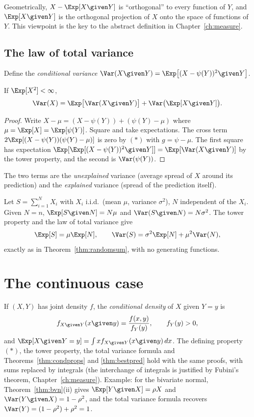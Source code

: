 Geometrically, $X-\Exp[X\given Y]$ is ``orthogonal'' to every function of $Y$, and
$\Exp[X\given Y]$ is the orthogonal projection of $X$ onto the space of functions
of $Y$. This viewpoint is the key to the abstract definition in
Chapter~\ref{ch:measure}.

\subsection*{The law of total variance}

Define the \emph{conditional variance}
$\Var(X\given Y)=\Exp\bigl[(X-\psi(Y))^2\given Y\bigr]$.

\begin{theorem}\label{thm:totalvar}
If $\Exp[X^2]<\infty$,
\[
\Var(X)=\Exp\bigl[\Var(X\given Y)\bigr]+\Var\bigl(\Exp[X\given Y]\bigr).
\]
\end{theorem}
\begin{proof}
Write $X-\mu=(X-\psi(Y))+(\psi(Y)-\mu)$ where $\mu=\Exp[X]=\Exp[\psi(Y)]$. Square
and take expectations. The cross term $2\Exp[(X-\psi(Y))(\psi(Y)-\mu)]$ is zero by
$(\ast)$ with $g=\psi-\mu$. The first square has expectation
$\Exp[\Exp[(X-\psi(Y))^2\given Y]]=\Exp[\Var(X\given Y)]$ by the tower property, and
the second is $\Var(\psi(Y))$.
\end{proof}

The two terms are the \emph{unexplained} variance (average spread of $X$ around its
prediction) and the \emph{explained} variance (spread of the prediction itself).

\begin{example}
Let $S=\sum_{i=1}^NX_i$ with $X_i$ i.i.d.\ (mean $\mu$, variance $\sigma^2$), $N$
independent of the $X_i$. Given $N=n$, $\Exp[S\given N]=N\mu$ and
$\Var(S\given N)=N\sigma^2$. The tower property and the law of total variance give
\[
\Exp[S]=\mu\Exp[N],\qquad\Var(S)=\sigma^2\Exp[N]+\mu^2\Var(N),
\]
exactly as in Theorem~\ref{thm:randomsum}, with no generating functions.
\end{example}

\section{The continuous case}

If $(X,Y)$ has joint density $f$, the \emph{conditional density} of $X$ given $Y=y$ is
\[
f_{X\given Y}(x\given y)=\frac{f(x,y)}{f_Y(y)},\qquad f_Y(y)>0,
\]
and $\Exp[X\given Y=y]=\int xf_{X\given Y}(x\given y)\,dx$. The defining
property $(\ast)$, the tower property, the total variance formula and
Theorems~\ref{thm:condprops} and \ref{thm:bestpred} hold with the same proofs, with
sums replaced by integrals (the interchange of integrals is justified by Fubini's
theorem, Chapter~\ref{ch:measure}). Example: for the bivariate normal,
Theorem~\ref{thm:bvn}(ii) gives $\Exp[Y\given X]=\rho X$ and $\Var(Y\given X)=1-\rho^2$,
and the total variance formula recovers $\Var(Y)=(1-\rho^2)+\rho^2=1$.


